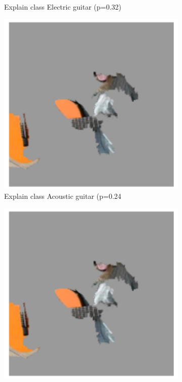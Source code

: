\begin{figure}[H]
\begin{subfigure}[t]{.23\textwidth}
        \caption{Explain class Electric guitar (p=0.32)}
    \end{subfigure}\hfill%
    \begin{subfigure}[t]{.23\textwidth}
        \centering
        \includegraphics[width=\linewidth]{chapters/02_methods/images/lime_dog_3.png}
        \caption{Explain class Acoustic guitar (p=0.24}
    \end{subfigure}\hfill%
    \begin{subfigure}[t]{.23\textwidth}
        \centering
        \includegraphics[width=\linewidth]{chapters/02_methods/images/lime_dog_3.png}

\end{subfigure}
\end{figure}
